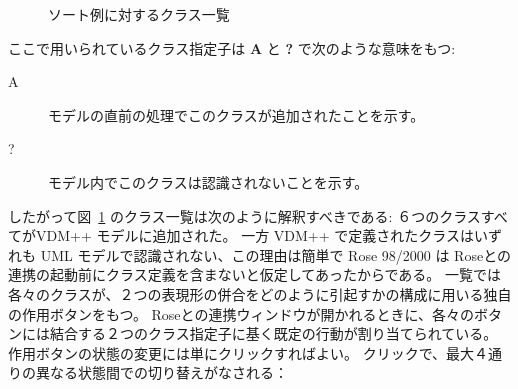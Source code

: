 \documentclass[\pformat,12pt]{jarticle}
\newcommand{\vdmpp}{VDM++}
\newcommand{\link}{Roseとの連携}
\newcommand{\rose}{Rose 98/2000}
\begin{document}
\begin{figure}[htb]
\begin{center}
\mbox{}
\caption{ソート例に対するクラス一覧　\label{fig:VDMtoUML}}
\end{center}
\end{figure}

ここで用いられているクラス指定子は {\bf A} と  {\bf ?} で次のような意味をもつ: 

\begin{description}  
\item [A]       モデルの直前の処理でこのクラスが追加されたことを示す。
\item [?]       モデル内でこのクラスは認識されないことを示す。
\end{description}  

したがって図~\ref{fig:VDMtoUML} のクラス一覧は次のように解釈すべきである: ６つのクラスすべてが\vdmpp{} モデルに追加された。
一方 \vdmpp{} で定義されたクラスはいずれも UML モデルで認識されない、この理由は簡単で \rose{} は \link{}の起動前にクラス定義を含まないと仮定してあったからである。
一覧では各々のクラスが、２つの表現形の併合をどのように引起すかの構成に用いる独自の作用ボタンをもつ。
\link{}ウィンドウが開かれるときに、各々のボタンには結合する２つのクラス指定子に基く既定の行動が割り当てられている。
作用ボタンの状態の変更には単にクリックすればよい。
クリックで、最大４通りの異なる状態間での切り替えがなされる：
\end{document}
